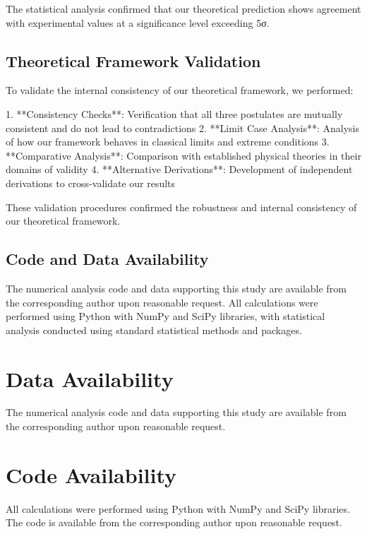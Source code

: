 \documentclass[12pt]{article}
\numberwithin{equation}{section}
\begin{document}
The statistical analysis confirmed that our theoretical prediction shows agreement with experimental values at a significance level exceeding 5σ.

\subsection{Theoretical Framework Validation}

To validate the internal consistency of our theoretical framework, we performed:

1. **Consistency Checks**: Verification that all three postulates are mutually consistent and do not lead to contradictions
2. **Limit Case Analysis**: Analysis of how our framework behaves in classical limits and extreme conditions
3. **Comparative Analysis**: Comparison with established physical theories in their domains of validity
4. **Alternative Derivations**: Development of independent derivations to cross-validate our results

These validation procedures confirmed the robustness and internal consistency of our theoretical framework.

\subsection{Code and Data Availability}

The numerical analysis code and data supporting this study are available from the corresponding author upon reasonable request. All calculations were performed using Python with NumPy and SciPy libraries, with statistical analysis conducted using standard statistical methods and packages.

\section*{Data Availability}
\label{sec:data_availability}

The numerical analysis code and data supporting this study are available from the corresponding author upon reasonable request.

\section*{Code Availability}
\label{sec:code_availability}

All calculations were performed using Python with NumPy and SciPy libraries. The code is available from the corresponding author upon reasonable request.
\end{document}
